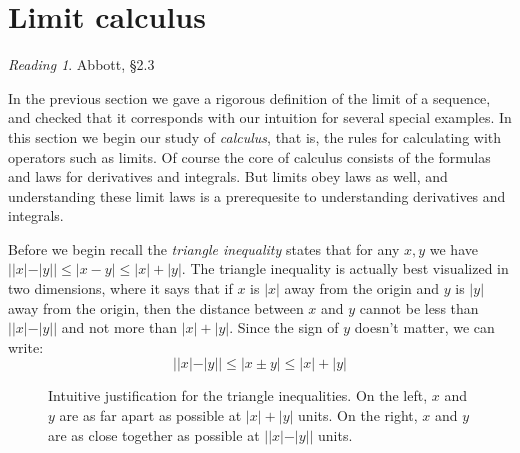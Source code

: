 \documentclass[11pt,oneside]{amsbook}
\theoremstyle{definition}
\theoremstyle{plain}
\theoremstyle{definition}
\theoremstyle{remark}
\newtheorem*{reading}{Reading}
\numberwithin{equation}{section}
\numberwithin{figure}{section}
\begin{document}
\newpage
\section{Limit calculus}

\begin{reading}
  Abbott, \S 2.3
\end{reading}

In the previous section we gave a rigorous definition of the limit of a sequence, and checked that it corresponds with our intuition for several special examples. In this section we begin our study of \emph{calculus}, that is, the rules for calculating with operators such as limits. Of course the core of calculus consists of the formulas and laws for derivatives and integrals. But limits obey laws as well, and understanding these limit laws is a prerequesite to understanding derivatives and integrals.

Before we begin recall the \emph{triangle inequality} states that for any $x,y$ we have $||x|-|y||\leq|x-y|\leq|x|+|y|$. The triangle inequality is actually best visualized in two dimensions, where it says that if $x$ is $|x|$ away from the origin and $y$ is $|y|$ away from the origin, then the distance between $x$ and $y$ cannot be less than $||x|-|y||$ and not more than $|x|+|y|$. Since the sign of $y$ doesn't matter, we can write:
\[||x|-|y||\leq|x\pm y|\leq|x|+|y|
\]

\begin{figure}[h]
  \centering
  \qquad
  \caption{Intuitive justification for the triangle inequalities. On the left, $x$ and $y$ are as far apart as possible at $|x|+|y|$ units. On the right, $x$ and $y$ are as close together as possible at $||x|-|y||$ units.}
\end{figure}
\end{document}
